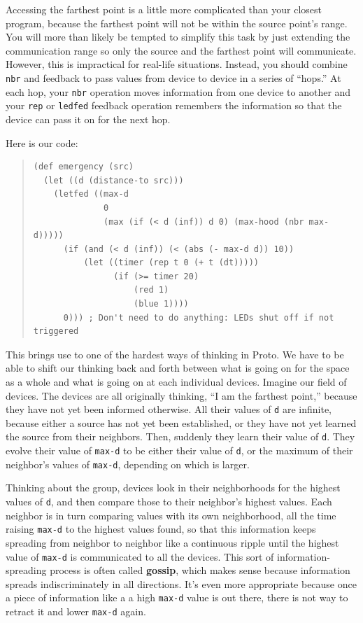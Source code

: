 \documentclass{article}
\newcommand\var[1]{{\tt #1}}
\begin{document}
Accessing the farthest point is a little more complicated than your
closest program, because the farthest point will not be within the
source point's range.  You will more than likely be tempted to
simplify this task by just extending the communication range so only
the source and the farthest point will communicate.  However, this is
impractical for real-life situations.  Instead, you should combine
\var{nbr} and feedback to pass values from device to device in a
series of ``hops.''  At each hop, your \var{nbr} operation moves
information from one device to another and your \var{rep} or
\var{ledfed} feedback operation remembers the information so that the
device can pass it on for the next hop.

Here is our code:
\begin{quote}
\begin{verbatim}
(def emergency (src) 
  (let ((d (distance-to src))) 
    (letfed ((max-d 
              0 
              (max (if (< d (inf)) d 0) (max-hood (nbr max-d)))))
      (if (and (< d (inf)) (< (abs (- max-d d)) 10)) 
          (let ((timer (rep t 0 (+ t (dt)))))                        
                (if (>= timer 20) 
                    (red 1) 
                    (blue 1))))
      0))) ; Don't need to do anything: LEDs shut off if not triggered
\end{verbatim}
\end{quote}

This brings use to one of the hardest ways of thinking in Proto.  We
have to be able to shift our thinking back and forth between what is
going on for the space as a whole and what is going on at each
individual devices.  Imagine our field of devices. The devices are all
originally thinking, ``I am the farthest point,'' because they have
not yet been informed otherwise.  All their values of \var{d} are
infinite, because either a source has not yet been established, or
they have not yet learned the source from their neighbors.  Then,
suddenly they learn their value of \var{d}.  They evolve their value
of \var{max-d} to be either their value of \var{d}, or the maximum of
their neighbor's values of \var{max-d}, depending on which is larger.

Thinking about the group, devices look in their neighborhoods for the
highest values of \var{d}, and then compare those to their neighbor's
highest values.  Each neighbor is in turn comparing values with its
own neighborhood, all the time raising \var{max-d} to the highest
values found, so that this information keeps spreading from neighbor
to neighbor like a continuous ripple until the highest value of
\var{max-d} is communicated to all the devices.  This sort of
information-spreading process is often called {\bf gossip}, which
makes sense because information spreads indiscriminately in all
directions.  It's even more appropriate because once a piece of
information like a a high \var{max-d} value is out there, there is not
way to retract it and lower \var{max-d} again.
\end{document}
